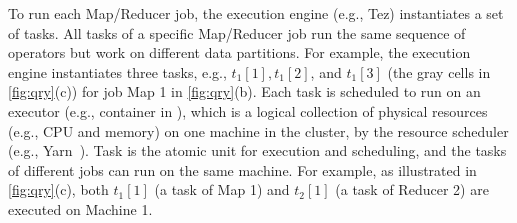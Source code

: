 To run each Map/Reducer job, the execution engine (e.g., Tez) instantiates a set of tasks.
All tasks of a specific Map/Reducer job run the same sequence of operators but work on different data partitions.
For example, the execution engine instantiates three tasks, e.g., $t_{1}[1], t_{1}[2]$, and $t_{1}[3]$ (the gray cells in \autoref{fig:qry}(c)) for job Map 1 in \autoref{fig:qry}(b). 
Each task is scheduled to run on an executor (e.g., container in \hive{}), which is a logical collection of physical resources (e.g., CPU and memory) on one machine in the cluster, by the resource scheduler (e.g., Yarn~\cite{vavilapalli2013apache}).
Task is the atomic unit for execution and scheduling, and the tasks of different jobs can run on the same machine.
For example, as illustrated in \autoref{fig:qry}(c), both $t_{1}[1]$ (a task of Map 1) and $t_{2}[1]$ (a task of Reducer 2) are executed on Machine 1. 


